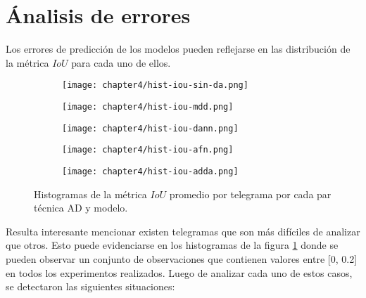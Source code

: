 \lipsum[1]

\section*{\'Analisis de errores}

Los errores de predicci\'on de los modelos pueden reflejarse en las distribuci\'on de la m\'etrica $IoU$ para cada uno
de ellos.

\begin{figure}[H]
    \centering
    \begin{subfigure}[h]{0.43\textwidth}
        \texttt{[image: chapter4/hist-iou-sin-da.png]}
    \end{subfigure}
    \hfill
    \begin{subfigure}[h]{0.43\textwidth}
        \texttt{[image: chapter4/hist-iou-mdd.png]}
    \end{subfigure}
    \hfill
    \begin{subfigure}[h]{0.43\textwidth}
        \texttt{[image: chapter4/hist-iou-dann.png]}
    \end{subfigure}
    \hfill
    \begin{subfigure}[h]{0.43\textwidth}
        \texttt{[image: chapter4/hist-iou-afn.png]}
    \end{subfigure}
    \hfill
    \begin{subfigure}[h]{0.43\textwidth}
        \texttt{[image: chapter4/hist-iou-adda.png]}
    \end{subfigure}

    \caption{Histogramas de la m\'etrica $IoU$ promedio por telegrama por cada par t\'ecnica AD y modelo.}
    \label{fig:histogramas-ious}
\end{figure}

Resulta interesante mencionar existen telegramas que son m\'as dif\'iciles de analizar que otros. Esto puede
evidenciarse en los histogramas de la figura \ref{fig:histogramas-ious} donde se pueden observar un conjunto de
observaciones que contienen valores entre [0, 0.2] en todos los experimentos realizados. Luego de analizar cada uno de
estos casos, se detectaron las siguientes situaciones:

